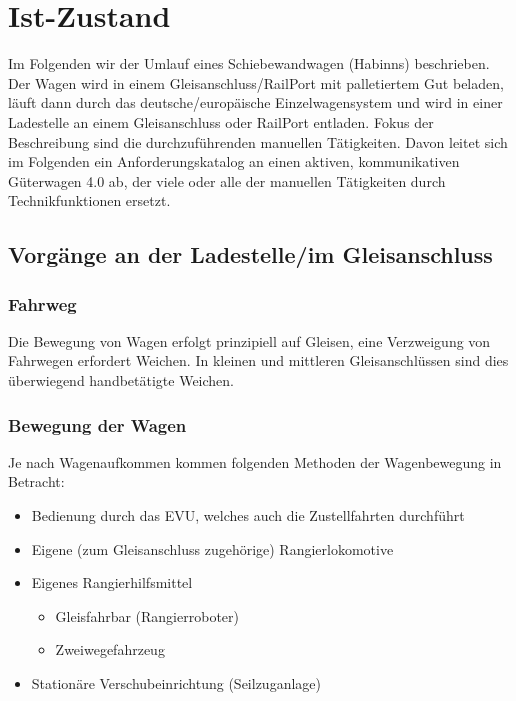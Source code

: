 \section{Ist-Zustand} %
Im Folgenden wir der Umlauf eines \gls{Schiebewandwagen} (Habinns) beschrieben. Der Wagen wird in einem \gls{Gleisanschluss}/RailPort mit palletiertem Gut beladen, läuft dann durch das deutsche/europäische Einzelwagensystem und wird in einer Ladestelle an einem Gleisanschluss oder RailPort entladen. Fokus der Beschreibung sind die durchzuführenden manuellen Tätigkeiten. Davon leitet sich im Folgenden ein Anforderungskatalog an einen aktiven, kommunikativen Güterwagen 4.0 ab, der viele oder alle der manuellen Tätigkeiten durch Technikfunktionen ersetzt.

\subsection{Vorgänge an der Ladestelle/im Gleisanschluss}
\subsubsection{Fahrweg} \label{sec:Fahrweg}
Die Bewegung von Wagen erfolgt prinzipiell auf Gleisen, eine Verzweigung von Fahrwegen erfordert Weichen. In kleinen und mittleren Gleisanschlüssen sind dies überwiegend handbetätigte Weichen. 
\subsubsection{Bewegung der Wagen} \label{sec:BewdWagen}
Je nach Wagenaufkommen kommen folgenden Methoden der Wagenbewegung in Betracht:
\begin{itemize}
	\item Bedienung durch das \acrshort{EVU}, welches auch die Zustellfahrten durchführt
	\item Eigene (zum \gls{Gleisanschluss} zugehörige) Rangierlokomotive
	\item Eigenes Rangierhilfsmittel
	\begin{itemize}
	    \item Gleisfahrbar (Rangierroboter)
	    \item Zweiwegefahrzeug
	\end{itemize}
	\item Stationäre Verschubeinrichtung (Seilzuganlage)
\end{itemize}
